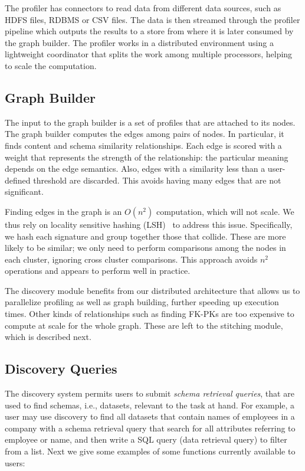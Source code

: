 The profiler has connectors to read data from different data sources, such as
HDFS files, RDBMS or CSV files. The data is then streamed through the profiler
pipeline which outputs the results
to a store from where it is later consumed by the graph builder.
The profiler works in a distributed environment using a lightweight coordinator
that splits the work among multiple processors, helping to scale the
computation.

\subsection{Graph Builder}

The input to the graph builder is a set of profiles that are attached to its
nodes. The graph builder computes the edges among pairs of nodes. In particular,
it finds content and schema similarity relationships. Each edge is scored with a
weight that represents the strength of the relationship: the particular meaning
depends on the edge semantics.  Also, edges with a
similarity less than a user-defined threshold are discarded.  This avoids having
many edges that are not significant.

Finding edges in the graph is an $O(n^2)$ computation, which will not scale.  We
thus rely on locality sensitive hashing
(LSH)~\cite{DBLP:conf/compgeom/DatarIIM04} to address this issue. Specifically,
we hash each signature and group together those that collide.  These are more
likely to be similar; we only need to perform comparisons among the nodes in
each cluster, ignoring cross cluster comparisons.  This approach avoids $n^2$
operations and appears to perform well in practice.

The discovery module benefits from our distributed architecture that allows us
to parallelize profiling as well as graph building, further speeding up
execution times. Other kinds of relationships such as finding FK-PKs are too
expensive to compute at scale for the whole graph.  These are left to the
stitching module, which is described next.

\subsection{Discovery Queries}
\label{subsec:api}

The discovery system permits users to submit \emph{schema retrieval queries},
that are used to find schemas, i.e., datasets, relevant to the task at hand. For
example, a user may use discovery to find all datasets that contain names of
employees in a company with a schema retrieval query that search for all
attributes referring to employee or name, and then write a SQL query (data
retrieval query) to filter from a list. Next we give some examples of some functions
currently available to users:

